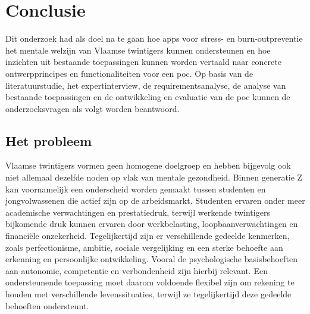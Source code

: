 
\chapter{Conclusie}%
\label{ch:conclusie}


Dit onderzoek had als doel na te gaan hoe apps voor stress- en burn-outpreventie het mentale welzijn van Vlaamse twintigers kunnen ondersteunen en hoe inzichten uit bestaande toepassingen kunnen worden vertaald naar concrete ontwerpprincipes en functionaliteiten voor een \acrshort{poc}. Op basis van de literatuurstudie, het expertinterview, de requirementsanalyse, de analyse van bestaande toepassingen en de ontwikkeling en evaluatie van de \acrshort{poc} kunnen de onderzoeksvragen als volgt worden beantwoord.

\vspace{1em}

\section{Het probleem}
\label{sec:het-probleem-conclusie}

\vspace{1em}

Vlaamse twintigers vormen geen homogene doelgroep en hebben bijgevolg ook niet allemaal dezelfde noden op vlak van mentale gezondheid. Binnen generatie Z kan voornamelijk een onderscheid worden gemaakt tussen studenten en jongvolwassenen die actief zijn op de arbeidsmarkt. Studenten ervaren onder meer academische verwachtingen en prestatiedruk, terwijl werkende twintigers bijkomende druk kunnen ervaren door werkbelasting, loopbaanverwachtingen en financiële onzekerheid. Tegelijkertijd zijn er verschillende gedeelde kenmerken, zoals perfectionisme, ambitie, sociale vergelijking en een sterke behoefte aan erkenning en persoonlijke ontwikkeling. Vooral de psychologische basisbehoeften aan autonomie, competentie en verbondenheid zijn hierbij relevant. Een ondersteunende toepassing moet daarom voldoende flexibel zijn om rekening te houden met verschillende levenssituaties, terwijl ze tegelijkertijd deze gedeelde behoeften ondersteunt.

